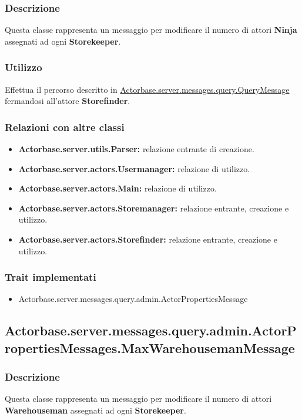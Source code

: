 \documentclass[a4paper]{article}
\begin{document}
			\subsubsection{Descrizione}
				Questa classe rappresenta un messaggio per modificare il numero di attori \textbf{Ninja} assegnati ad ogni \textbf{Storekeeper}.
				
			\subsubsection{Utilizzo}
				Effettua il percorso descritto in \hyperref[QueryMessage]{Actorbase.server.messages.query.QueryMessage} fermandosi all'attore 
				\textbf{Storefinder}.
				
			\subsubsection{Relazioni con altre classi}
				\begin{itemize}
					\item \textbf{Actorbase.server.utils.Parser:} relazione entrante di creazione.
					\item \textbf{Actorbase.server.actors.Usermanager:} relazione di utilizzo.
					\item \textbf{Actorbase.server.actors.Main:} relazione di utilizzo.
					\item \textbf{Actorbase.server.actors.Storemanager:} relazione entrante, creazione e utilizzo.
					\item \textbf{Actorbase.server.actors.Storefinder:} relazione entrante, creazione e utilizzo.
				\end{itemize}
			\subsubsection{Trait implementati}
				\begin{itemize}
					\item Actorbase.server.messages.query.admin.ActorPropertiesMessage
				\end{itemize}

		\subsection{Actorbase.server.messages.query.admin.ActorPropertiesMessages.MaxWarehousemanMessage}
			\subsubsection{Descrizione}
				Questa classe rappresenta un messaggio per modificare il numero di attori \textbf{Warehouseman} assegnati ad ogni \textbf{Storekeeper}.
				
\end{document}
